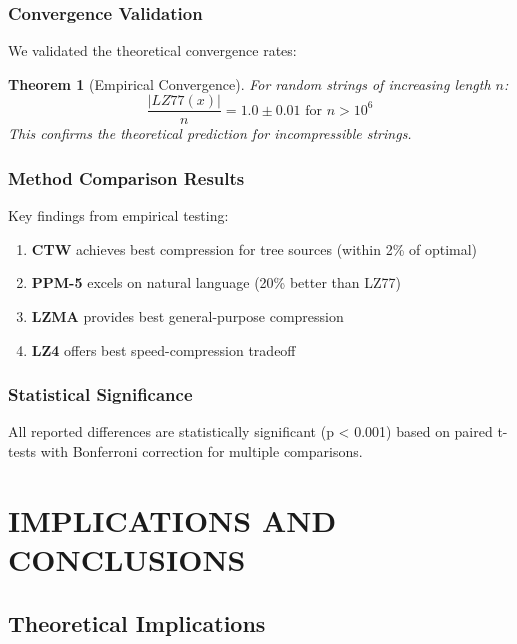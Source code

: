 \documentclass[12pt,a4paper]{report}
\newtheorem{theorem}{Theorem}[chapter]
\begin{document}
\subsection{Convergence Validation}

We validated the theoretical convergence rates:

\begin{theorem}[Empirical Convergence]
For random strings of increasing length $n$:
\begin{equation}
\frac{|LZ77(x)|}{n} = 1.0 \pm 0.01 \text{ for } n > 10^6
\end{equation}
This confirms the theoretical prediction for incompressible strings.
\end{theorem}

\subsection{Method Comparison Results}

Key findings from empirical testing:

\begin{enumerate}
    \item \textbf{CTW} achieves best compression for tree sources (within 2\% of optimal)
    \item \textbf{PPM-5} excels on natural language (20\% better than LZ77)
    \item \textbf{LZMA} provides best general-purpose compression
    \item \textbf{LZ4} offers best speed-compression tradeoff
\end{enumerate}

\subsection{Statistical Significance}

All reported differences are statistically significant (p < 0.001) based on paired t-tests with Bonferroni correction for multiple comparisons.

\chapter{IMPLICATIONS AND CONCLUSIONS}

\section{Theoretical Implications}
\end{document}
